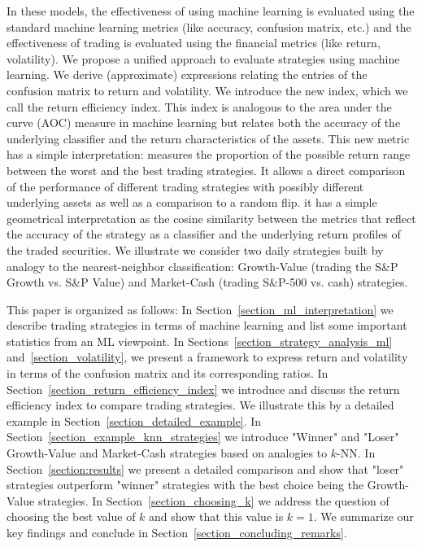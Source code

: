 \documentclass{article}
\begin{document}
In these models, the effectiveness of using machine learning is 
evaluated using the standard machine learning metrics
(like accuracy, confusion matrix, etc.) and the effectiveness 
of trading is evaluated using the financial metrics
(like return, volatility). We propose a unified approach 
to evaluate strategies using machine learning. We derive
(approximate) expressions relating the entries of the confusion matrix to return and volatility.
We introduce the new index, which we call the return efficiency index. This index 
is analogous to the area under the curve (AOC) measure in machine learning but relates both the accuracy of the underlying classifier and the return characteristics of the assets. This new metric has a simple 
interpretation: measures the proportion of the possible return range between the worst and the best trading 
strategies. It allows a direct comparison of the performance of different trading strategies
with possibly different underlying assets as well as a comparison to a random flip. it has a simple geometrical interpretation as the cosine similarity between the metrics that reflect the accuracy of the strategy as a classifier and the underlying return profiles of the traded securities. 
We illustrate we consider two daily strategies built by analogy to the nearest-neighbor 
classification: Growth-Value (trading the S{\&}P Growth vs. S{\&}P Value) and Market-Cash
(trading S{\&}P-500 vs. cash) strategies. 

This paper is organized as follows:
In Section~\ref{section_ml_interpretation} we describe trading strategies in terms of machine learning
and list some important statistics from an ML viewpoint.
In Sections~\ref{section_strategy_analysis_ml} and~\ref{section_volatility}, we present a framework to express return and volatility in terms of 
the confusion matrix and its corresponding ratios. In Section~\ref{section_return_efficiency_index} we introduce and discuss the 
return efficiency index to compare trading strategies. We illustrate this by a detailed example in 
Section~\ref{section_detailed_example}.
In Section~\ref{section_example_knn_strategies} we introduce "Winner" and "Loser" Growth-Value and Market-Cash 
strategies based on analogies to $k$-NN.
In Section~\ref{section:results} we present a detailed comparison and show that "loser" strategies outperform 
"winner" strategies with the best choice being the Growth-Value strategies. 
In Section~\ref{section_choosing_k} we address the question of choosing the best value of $k$ and show that this value
is $k=1$. We summarize our key findings and conclude in Section~\ref{section_concluding_remarks}. 
\end{document}
